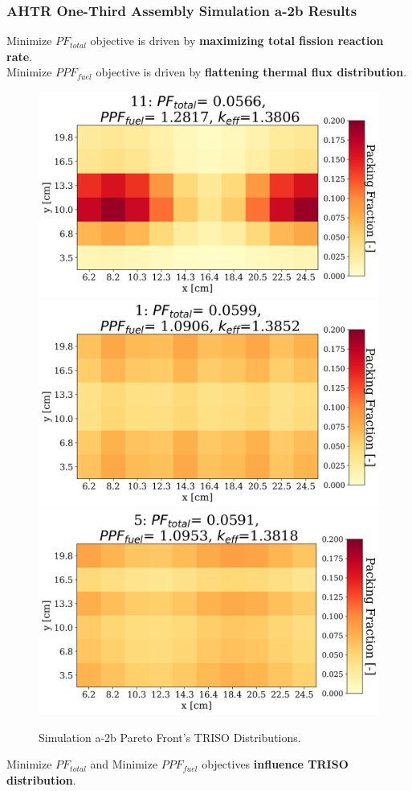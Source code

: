 \begin{frame}
    \frametitle{AHTR One-Third Assembly Simulation a-2b Results}
    Minimize $PF_{total}$ objective is driven by \textbf{maximizing 
    total fission reaction rate}. \\
    Minimize $PPF_{fuel}$ objective is driven by \textbf{flattening 
    thermal flux distribution}. 

    \begin{figure}
        \centering
        \includegraphics[width=0.37\linewidth]{../docs/figures/a-2b-pf-most-minimized.png} 
        \includegraphics[width=0.37\linewidth]{../docs/figures/a-2b-ppf-most-minimized.png} 
        \includegraphics[width=0.37\linewidth]{../docs/figures/a-2b-both-most-minimized.png}
        \caption{Simulation a-2b Pareto Front's TRISO Distributions.}
    \end{figure}
    \vspace{-0.2cm}
    Minimize $PF_{total}$ and Minimize $PPF_{fuel}$ objectives \textbf{influence TRISO distribution}. 
\end{frame}

